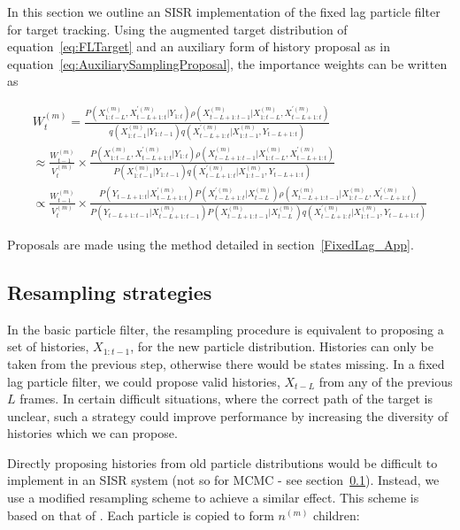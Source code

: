 In this section we outline an SISR implementation of the fixed lag particle filter for target tracking. Using the augmented target distribution of equation~\ref{eq:FLTarget} and an auxiliary form of history proposal as in equation~\ref{eq:AuxiliarySamplingProposal}, the importance weights can be written as

\begin{multline}
W_t^{(m)} = \frac{ P(X_{1:t-L}^{(m)}, X_{t-L+1:t}^{'(m)}|Y_{1:t}) \rho(X_{t-L+1:t-1}^{(m)}|X_{1:t-L}^{(m)}, X_{t-L+1:t}^{'(m)}) }{ q(X_{1:t-1}^{(m)}|Y_{1:t-1}) q(X_{t-L+1:t}^{'(m)}|X_{1:t-1}^{(m)}, Y_{t-L+1:t}) } \\
\approx \frac{W_{t-1}^{(m)}}{V_t^{(m)}} \times \frac{ P(X_{1:t-L}^{(m)}, X_{t-L+1:t}^{'(m)}|Y_{1:t}) \rho(X_{t-L+1:t-1}^{(m)}|X_{1:t-L}^{(m)}, X_{t-L+1:t}^{'(m)}) }{ P(X_{1:t-1}^{(m)}|Y_{1:t-1}) q(X_{t-L+1:t}^{'(m)}|X_{1:t-1}^{(m)}, Y_{t-L+1:t}) } \\
\propto \frac{W_{t-1}^{(m)}}{V_t^{(m)}} \times \frac{ P(Y_{t-L+1:t}|X_{t-L+1:t}^{'(m)}) P(X_{t-L+1:t}^{'(m)}|X_{t-L}^{(m)}) \rho(X_{t-L+1:t-1}^{(m)}|X_{1:t-L}^{(m)}, X_{t-L+1:t}^{'(m)}) }{ P(Y_{t-L+1:t-1}|X_{t-L+1:t-1}^{(m)}) P(X_{t-L+1:t-1}^{(m)}|X_{t-L}^{(m)}) q(X_{t-L+1:t}^{'(m)}|X_{1:t-1}^{(m)}, Y_{t-L+1:t}) }
\label{eq:}
\end{multline}

Proposals are made using the method detailed in section~\ref{FixedLag_App}.



\subsection{Resampling strategies}
In the basic particle filter, the resampling procedure is equivalent to proposing a set of histories, $X_{1:t-1}$, for the new particle distribution. Histories can only be taken from the previous step, otherwise there would be states missing. In a fixed lag particle filter, we could propose valid histories, $X_{t-L}$ from any of the previous $L$ frames. In certain difficult situations, where the correct path of the target is unclear, such a strategy could improve performance by increasing the diversity of histories which we can propose.

Directly proposing histories from old particle distributions would be difficult to implement in an SISR system (not so for MCMC - see section~\ref{}). Instead, we use a modified resampling scheme to achieve a similar effect. This scheme is based on that of \cite{Godsill2007}. Each particle is copied to form $n^{(m)}$ children:

